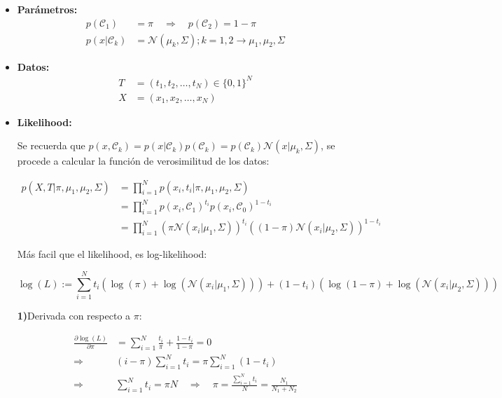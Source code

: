 \begin{itemize}
    \item\textbf{Parámetros:}
    \begin{align}
    p(\mathcal{C}_1)&=\pi \quad \Rightarrow \quad p(\mathcal{C}_2)=1-\pi\\
    p(x|\mathcal{C}_k) &= \mathcal{N}(\mu_k,  \Sigma); k=1,2
    \rightarrow \mu_1,\mu_2,\Sigma
    \end{align}
    
    \item\textbf{Datos:}
    \begin{align}
    T&=(t_1,t_2,\ldots,t_N) \in \{0,1\}^N\\
    X&=(x_1,x_2,\ldots,x_N)
    \end{align}
    
    \item\textbf{Likelihood:}
    
    Se recuerda que $p(x,\mathcal{C}_k)=p(x|\mathcal{C}_k)p(\mathcal{C}_k)=p(\mathcal{C}_k)\mathcal{N}(x|\mu_k,\Sigma)$, se procede a calcular la función de verosimilitud de los datos:
    
    \begin{align}
    p(X,T|\pi,\mu_1,\mu_2,\Sigma) &= \prod_{i=1}^{N}p(x_i,t_i|\pi,\mu_1,\mu_2,\Sigma)\\
    &= \prod_{i=1}^{N}p(x_i,\mathcal{C}_1)^{t_i}p(x_i,\mathcal{C}_0)^{1-t_i}\\
    &= \prod_{i=1}^{N}(\pi\mathcal{N}(x_i|\mu_1,\Sigma))^{t_i}
    ((1-\pi)\mathcal{N}(x_i|\mu_2,\Sigma))^{1-t_i}
    \end{align}
    
    Más facil que el likelihood, es log-likelihood:
    
    \begin{equation}
    \log(L) := \sum_{i=1}^{N}t_i(\log(\pi)+\log(\mathcal{N}(x_i|\mu_1,\Sigma)))+(1-t_i)(\log(1-\pi)+\log(\mathcal{N}(x_i|\mu_2,\Sigma)))
    \end{equation}
    
    \newpage
    \noindent \textbf{1)}Derivada con respecto a $\pi$:
    
    \begin{align}
    \frac{\partial\log(L)}{\partial\pi} &= \sum_{i=1}^N \frac{t_i}{\pi}+\frac{1-t_i}{1-\pi}=0\\
    \Rightarrow \quad & (i-\pi)\sum_{i=1}^Nt_i = \pi\sum_{i=1}^N(1-t_i)\\
    \Rightarrow \quad & \sum_{i=1}^Nt_i=\pi N \quad\Rightarrow\quad \pi = \frac{\sum_{i=1}^Nt_i}{N} = \frac{N_1}{N_1+N_2}
    \end{align}
    

\end{itemize}
